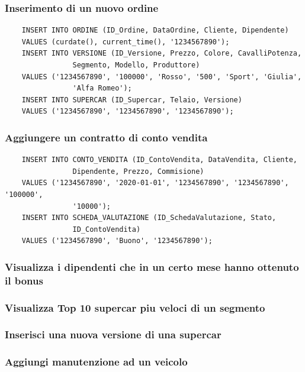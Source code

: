 \documentclass[12pt]{article}
\begin{document}
\subsubsection*{Inserimento di un nuovo ordine}
\begin{lstlisting}
    INSERT INTO ORDINE (ID_Ordine, DataOrdine, Cliente, Dipendente)
    VALUES (curdate(), current_time(), '1234567890');
    INSERT INTO VERSIONE (ID_Versione, Prezzo, Colore, CavalliPotenza, 
                Segmento, Modello, Produttore)
    VALUES ('1234567890', '100000', 'Rosso', '500', 'Sport', 'Giulia', 
                'Alfa Romeo');
    INSERT INTO SUPERCAR (ID_Supercar, Telaio, Versione)
    VALUES ('1234567890', '1234567890', '1234567890');
\end{lstlisting}

\subsubsection*{Aggiungere un contratto di conto vendita}
\begin{lstlisting}
    INSERT INTO CONTO_VENDITA (ID_ContoVendita, DataVendita, Cliente, 
                Dipendente, Prezzo, Commisione)
    VALUES ('1234567890', '2020-01-01', '1234567890', '1234567890', '100000', 
                '10000');
    INSERT INTO SCHEDA_VALUTAZIONE (ID_SchedaValutazione, Stato, 
                ID_ContoVendita)
    VALUES ('1234567890', 'Buono', '1234567890');
\end{lstlisting}

\subsubsection*{Visualizza i dipendenti che in un certo mese hanno
ottenuto il bonus}

\subsubsection*{Visualizza Top 10 supercar piu veloci di un segmento}

\subsubsection*{Inserisci una nuova versione di una supercar}

\subsubsection*{Aggiungi manutenzione ad un veicolo}
\end{document}
